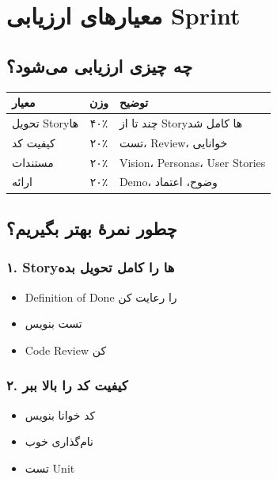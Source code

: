\documentclass[12pt, a4paper]{article}
\begin{document}
\section{معیارهای ارزیابی Sprint}

\subsection{چه چیزی ارزیابی می‌شود؟}

\begin{center}
\begin{tabular}{|l|c|p{8cm}|}
\hline
\textbf{معیار} & \textbf{وزن} & \textbf{توضیح} \\
\hline
تحویل Storyها & ۴۰٪ & چند تا از Storyها کامل شد \\
\hline
کیفیت کد & ۲۰٪ & تست، Review، خوانایی \\
\hline
مستندات & ۲۰٪ & Vision، Personas، User Stories \\
\hline
ارائه & ۲۰٪ & Demo، وضوح، اعتماد \\
\hline
\end{tabular}
\end{center}

\subsection{چطور نمرهٔ بهتر بگیریم؟}

\subsubsection{۱. Storyها را کامل تحویل بده}
\begin{itemize}
    \item Definition of Done را رعایت کن
    \item تست بنویس
    \item Code Review کن
\end{itemize}

\subsubsection{۲. کیفیت کد را بالا ببر}
\begin{itemize}
    \item کد خوانا بنویس
    \item نام‌گذاری خوب
    \item تست Unit
\end{itemize}
\end{document}
